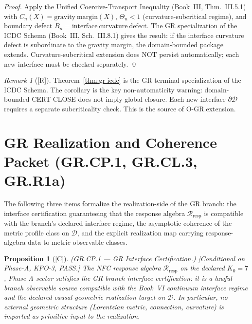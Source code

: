 \documentclass[12pt,oneside]{amsbook}
\theoremstyle{plain}
\newtheorem{proposition}[theorem]{Proposition}
\theoremstyle{definition}
\theoremstyle{remark}
\newtheorem{remark}[theorem]{Remark}
\newcommand{\status}[1]{\textup{[#1]}}
\begin{document}
\begin{proof}
Apply the Unified Coercive-Transport Inequality (Book~III,
Thm.~III.5.1) with $C_n(X) = \mathrm{gravity\ margin}(X)$,
$\Theta_n < 1$ (curvature-subcritical regime), and boundary
defect $B_n = \mathrm{interface\ curvature\ defect}$. The GR
specialization of the ICDC Schema (Book~III, Sch.~III.8.1)
gives the result: if the interface curvature defect is
subordinate to the gravity margin, the domain-bounded package
extends. Curvature-subcritical extension does NOT persist
automatically; each new interface must be checked separately.
\qed
\end{proof}

\begin{remark}[\status{R}]
Theorem~\ref{thm:gr-icdc} is the GR terminal specialization of
the ICDC Schema. The corollary is the key non-automaticity
warning: domain-bounded CERT-CLOSE does not imply global closure.
Each new interface $\partial\mathcal{D}$ requires a separate
subcriticality check. This is the source of O-GR.extension.
\end{remark}

\section{GR Realization and Coherence Packet (GR.CP.1, GR.CL.3, GR.R1a)}
\label{sec:gr-realization-packet}

The following three items formalize the realization-side of the GR
branch: the interface certification guaranteeing that the response
algebra $\mathcal{R}_{\mathrm{resp}}$ is compatible with the
branch's declared interface regime, the asymptotic coherence of the
metric profile class on $\mathcal{D}$, and the explicit realization
map carrying response-algebra data to metric observable classes.

\begin{proposition}[\status{C}]\label{prop:GR-CP1}
\textup{(GR.CP.1 --- GR Interface Certification.)}
\textup{[Conditional on Phase-A, KPO-3, PASS.]}
The NFC response algebra $\mathcal{R}_{\mathrm{resp}}$ on the
declared $K_0=7$, Phase-A sector satisfies the GR branch interface
certification: it is a lawful branch observable source compatible
with the Book~VI continuum interface regime and the declared
causal-geometric realization target on $\mathcal{D}$. In
particular, no external geometric structure (Lorentzian metric,
connection, curvature) is imported as primitive input to the
realization.
\end{proposition}
\end{document}
